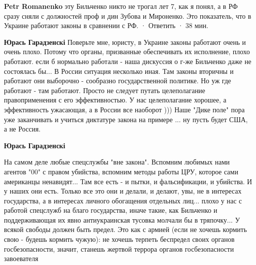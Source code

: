 \begin{itemize}
\begin{itemize}
\textbf{Petr Romanenko} эту Бильченко никто не трогал лет 7, как я понял, а в РФ сразу сняли с должностей проф и дин Зубова и Мироненко. Это показатель, что в Украине работают законы в сравнении с РФ.
 · Ответить · 38 мин.
 
\textbf{Юрась Гарадзенскі} Поверьте мне, юристу, в Украине законы работают очень и очень плохо. Потому что органы, призванные обеспечивать их исполнение, плохо работают. если б нормально работали - наша дискуссия о г-же Бильченко даже не состоялась бы... В России ситуация несколько иная. Там законы вторичны и работают они выборочно - сообразно государственной политике. Но уж где работают - там работают. Просто не следует путать целеполагание правоприменения с его эффективностью. У нас целеполагание хорошее, а эффективность ужасающая, а в России все наоборот ))) Наше "Дике поле" пора уже заканчивать и учиться диктатуре закона на примере ... ну пусть будет США, а не Россия.

 
\textbf{Юрась Гарадзенскі} 

На самом деле любые спецслужбы "вне закона". Вспомним любимых нами агентов "00"
с правом убийства, вспомним методы работы ЦРУ, которое сами американцы
ненавидят... Там все есть - и пытки, и фальсификации, и убийства. И у наших они
есть. Только все это они и делали, и делают, увы, не в интересах государства, а
в интересах личного обогащения отдельных лиц... плохо у нас с работой спецслужб
на благо государства, иначе такие, как Бильченко и поддерживающая их явно
антиукраинская тусовка молчали бы в тряпочку... У всякой свободы должен быть
предел. Это как с армией (если не хочешь кормить свою - будешь кормить чужую):
не хочешь терпеть беспредел своих органов госбезопасности, значит, станешь
жертвой террора органов госбезопасности завоевателя
\end{itemize}
 
 

\end{itemize}
